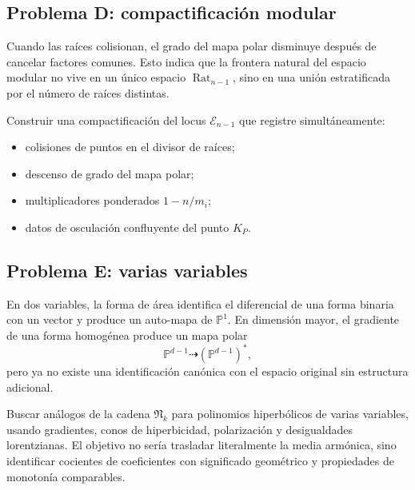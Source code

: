 \documentclass[11pt,oneside]{scrartcl}
\theoremstyle{plainblue}
\theoremstyle{definitionblue}
\theoremstyle{remarkgray}
\newcommand{\PP}{\mathbb{P}}
\newcommand{\cN}{\mathfrak{N}}
\newcommand{\cE}{\mathcal{E}}
\begin{document}
\subsection{Problema D: compactificación modular}

Cuando las raíces colisionan, el grado del mapa polar disminuye después de cancelar
factores comunes. Esto indica que la frontera natural del espacio modular no vive en
un único espacio \(\operatorname{Rat}_{n-1}\), sino en una unión estratificada por el
número de raíces distintas.

\begin{researchbox}[Problema D]
Construir una compactificación del locus \(\cE_{n-1}\) que registre simultáneamente:
\begin{itemize}[leftmargin=8mm]
\item colisiones de puntos en el divisor de raíces;
\item descenso de grado del mapa polar;
\item multiplicadores ponderados \(1-n/m_i\);
\item datos de osculación confluyente del punto \(K_P\).
\end{itemize}
\end{researchbox}

\subsection{Problema E: varias variables}

En dos variables, la forma de área identifica el diferencial de una forma binaria con
un vector y produce un auto-mapa de \(\PP^1\). En dimensión mayor, el gradiente de
una forma homogénea produce un mapa polar
\[
\PP^{d-1}\dashrightarrow(\PP^{d-1})^*,
\]
pero ya no existe una identificación canónica con el espacio original sin estructura
adicional.

\begin{researchbox}[Problema E]
Buscar análogos de la cadena \(\cN_k\) para polinomios hiperbólicos de varias
variables, usando gradientes, conos de hiperbicidad, polarización y desigualdades
lorentzianas. El objetivo no sería trasladar literalmente la media armónica, sino
identificar cocientes de coeficientes con significado geométrico y propiedades de
monotonía comparables.
\end{researchbox}
\end{document}
